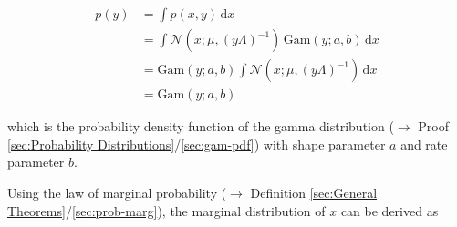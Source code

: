 \documentclass[a4paper,12pt,twoside]{book}
\begin{document}
\begin{equation} \label{eq:ng-marg-ng-marg-y-qed}
\begin{split}
p(y) &= \int p(x,y) \, \mathrm{d}x \\
&= \int \mathcal{N}(x; \mu, (y \Lambda)^{-1}) \, \mathrm{Gam}(y; a, b) \, \mathrm{d}x \\
&= \mathrm{Gam}(y; a, b) \int \mathcal{N}(x; \mu, (y \Lambda)^{-1}) \, \mathrm{d}x \\
&= \mathrm{Gam}(y; a, b)
\end{split}
\end{equation}

which is the probability density function of the gamma distribution ($\rightarrow$ Proof \ref{sec:Probability Distributions}/\ref{sec:gam-pdf}) with shape parameter $a$ and rate parameter $b$.

\vspace{1em}
Using the law of marginal probability ($\rightarrow$ Definition \ref{sec:General Theorems}/\ref{sec:prob-marg}), the marginal distribution of $x$ can be derived as
\end{document}
